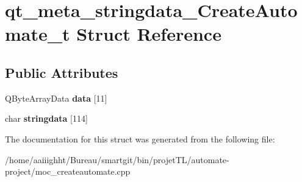 \hypertarget{structqt__meta__stringdata___create_automate__t}{\section{qt\-\_\-meta\-\_\-stringdata\-\_\-\-Create\-Automate\-\_\-t Struct Reference}
\label{structqt__meta__stringdata___create_automate__t}
}
\subsection*{Public Attributes}
\begin{DoxyCompactItemize}
\item 
\hypertarget{structqt__meta__stringdata___create_automate__t_a210bd9798698d39b50889826c7b0cdc4}{Q\-Byte\-Array\-Data {\bfseries data} \mbox{[}11\mbox{]}}\label{structqt__meta__stringdata___create_automate__t_a210bd9798698d39b50889826c7b0cdc4}

\item 
\hypertarget{structqt__meta__stringdata___create_automate__t_ad815d5cc87bba2f46cb82e58f587d01c}{char {\bfseries stringdata} \mbox{[}114\mbox{]}}\label{structqt__meta__stringdata___create_automate__t_ad815d5cc87bba2f46cb82e58f587d01c}

\end{DoxyCompactItemize}


The documentation for this struct was generated from the following file\-:\begin{DoxyCompactItemize}
\item 
/home/aaiiighht/\-Bureau/smartgit/bin/projet\-T\-L/automate-\/project/moc\-\_\-createautomate.\-cpp\end{DoxyCompactItemize}
